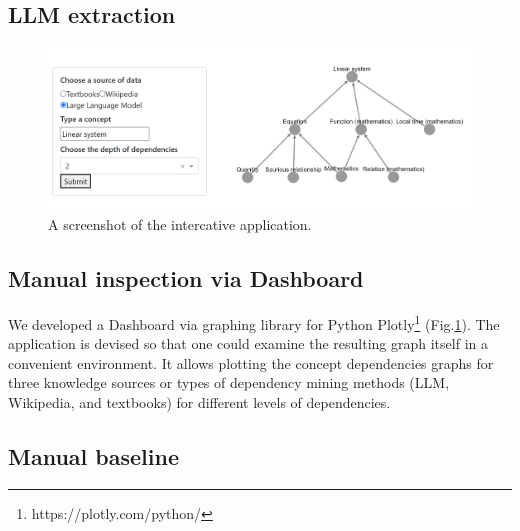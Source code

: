 \documentclass{article}
\begin{document}
\subsection{LLM extraction}


\begin{figure}
    \centering
    \includegraphics[width=.95\textwidth]{img/dash_example.png}
    \caption{A screenshot of the intercative application.}
    \label{fig:dash_example}
\end{figure}

\subsection{Manual inspection via Dashboard}
We developed a Dashboard via graphing library for Python Plotly\footnote{https://plotly.com/python/} (Fig.\ref{fig:dash_example}). The application is devised so that one could examine the resulting graph itself in a convenient environment. It allows plotting the concept dependencies graphs for three knowledge sources or types of dependency mining methods (LLM, Wikipedia, and textbooks) for different levels of dependencies.   



\subsection{Manual baseline}
\end{document}
